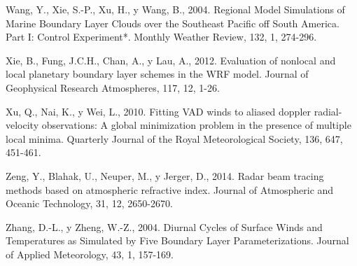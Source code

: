 \documentclass[12pt,spanish,oneside]{book}
\begin{document}
\hypertarget{ref-Wang2004}{}
Wang, Y., Xie, S.-P., Xu, H., y Wang, B., 2004. Regional Model
Simulations of Marine Boundary Layer Clouds over the Southeast Pacific
off South America. Part I: Control Experiment*. Monthly Weather Review,
132, 1, 274-296.

\hypertarget{ref-Xie2012}{}
Xie, B., Fung, J.C.H., Chan, A., y Lau, A., 2012. Evaluation of nonlocal
and local planetary boundary layer schemes in the WRF model. Journal of
Geophysical Research Atmospheres, 117, 12, 1-26.

\hypertarget{ref-Xu2010}{}
Xu, Q., Nai, K., y Wei, L., 2010. Fitting VAD winds to aliased doppler
radial-velocity observations: A global minimization problem in the
presence of multiple local minima. Quarterly Journal of the Royal
Meteorological Society, 136, 647, 451-461.

\hypertarget{ref-Zeng2014}{}
Zeng, Y., Blahak, U., Neuper, M., y Jerger, D., 2014. Radar beam tracing
methods based on atmospheric refractive index. Journal of Atmospheric
and Oceanic Technology, 31, 12, 2650-2670.

\hypertarget{ref-Zhang2004}{}
Zhang, D.-L., y Zheng, W.-Z., 2004. Diurnal Cycles of Surface Winds and
Temperatures as Simulated by Five Boundary Layer Parameterizations.
Journal of Applied Meteorology, 43, 1, 157-169.
\end{document}
